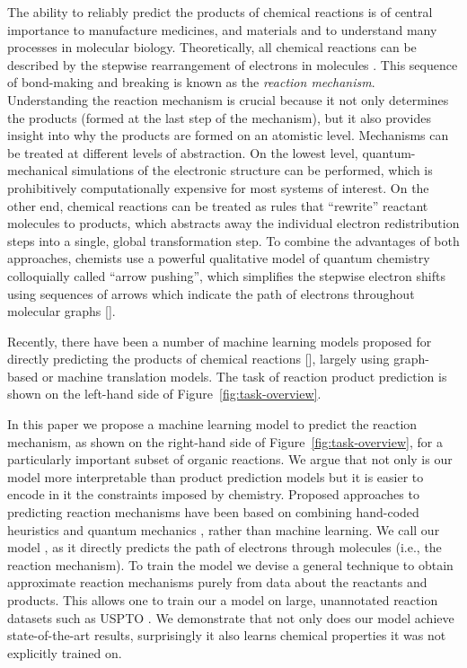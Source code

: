 
The ability to reliably predict the products of chemical reactions is of central importance to manufacture medicines, and materials and to understand many processes in molecular biology.
Theoretically, all chemical reactions can be described by the stepwise rearrangement of electrons in molecules \cite{herges1994organizing}. 
This sequence of bond-making and breaking is known as the \emph{reaction mechanism}. 
Understanding the reaction mechanism is crucial because it not only determines the products (formed at the last step of the mechanism), 
but it also provides insight into why the products are formed on an atomistic level. 
%
Mechanisms can be treated at different levels of abstraction. 
On the lowest level, quantum-mechanical simulations of the electronic structure can be performed, which is prohibitively computationally expensive for most systems of interest. 
On the other end, chemical reactions can be treated as rules that ``rewrite'' reactant molecules to products, which abstracts away the individual electron redistribution steps into a single, global transformation step. 
To combine the advantages of both approaches, chemists use a powerful qualitative model of quantum chemistry colloquially called ``arrow pushing'', which simplifies the stepwise electron shifts using sequences of arrows which indicate the path of electrons throughout molecular graphs [\cite{herges1994organizing}]. 

Recently, there have been a number of machine learning models proposed for directly predicting the products of chemical reactions [\cite{coley2017prediction,jin2017predicting,schwaller2017found,neural-symbolic,segler2018planning,wei2016neural}], largely using graph-based or machine translation models. 
The task of reaction product prediction is shown on the left-hand side of Figure~\ref{fig:task-overview}. 

In this paper we propose a machine learning model to predict the reaction mechanism, as shown on the right-hand side of Figure~\ref{fig:task-overview}, for a particularly important subset of organic reactions.
We argue that not only is our model more interpretable than product prediction models but it is easier to encode in it the constraints imposed by chemistry. 
Proposed approaches to predicting reaction mechanisms have been based on combining hand-coded heuristics and quantum mechanics \cite{bergeler2015heuristics,kim2018efficient,nandi2017tabu,rappoport2014complex,simm2017context,zimmerman2013automated}, 
rather than machine learning.
We call our model \ourModel, as it directly predicts the path of electrons through molecules (i.e., the reaction mechanism). 
To train the model we devise a general technique to obtain approximate reaction mechanisms purely from data about the reactants and products. 
This allows one to train our a model on large, unannotated reaction datasets such as USPTO \cite{lowe2012extraction}. We demonstrate that not only does our model achieve state-of-the-art results, surprisingly it also learns chemical properties it was not explicitly trained on.



